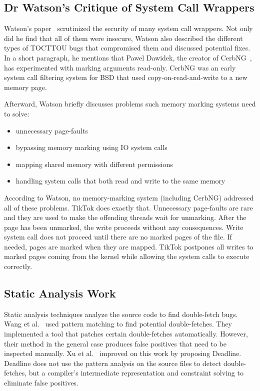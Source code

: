 \documentclass[conference]{IEEEtran}
\newcommand{\sysname}{TikTok}
\begin{document}
\subsection{Dr Watson's Critique of System Call Wrappers}
\label{subsec:watson}
Watson's paper~\cite{watson2007exploiting} scrutinized the security of many
system call wrappers. Not only did he find that all of them were insecure,
Watson also described the different types of TOCTTOU bugs that compromised them
and discussed potential fixes. In a short paragraph, he mentions that Pawel
Dawidek, the creator of CerbNG~\cite{zak_frasunek_dawidek}, has experimented
with marking arguments read-only. CerbNG was an early system call filtering
system for BSD that used copy-on-read-and-write to a new memory page.

Afterward, Watson briefly discusses problems such memory marking systems
need to solve: 
\begin{itemize}
    \item unnecessary page-faults
    \item bypassing memory marking using IO system calls
    \item mapping shared memory with different permissions
    \item handling system calls that both read and write to the same memory
\end{itemize}

According to Watson, no memory-marking system (including CerbNG) addressed all
of these problems. \sysname{} does exactly that. Unnecessary page-faults are rare
and they are used to make the offending threads wait for unmarking. After the
page has been unmarked, the write proceeds without any consequences. Write
system call does not proceed until there are no marked pages of the file. If
needed, pages are marked when they are mapped. \sysname{} postpones all writes to
marked pages coming from the kernel while allowing the system calls to execute
correctly.

\subsection{Static Analysis Work}
\label{subsec:dfstatic}
Static analysis techniques analyze the source code to find double-fetch bugs.
Wang et al.~\cite{wang2017double} used pattern matching to find potential
double-fetches. They implemented a tool that patches certain double-fetches
automatically. However, their method in the general case produces false
positives that need to be inspected manually. Xu et al.~\cite{xu2018precise}
improved on this work by proposing Deadline. Deadline does not use the pattern 
analysis on the source files to detect double-fetches, but a compiler's
intermediate representation and constraint solving to eliminate false positives.
\end{document}
